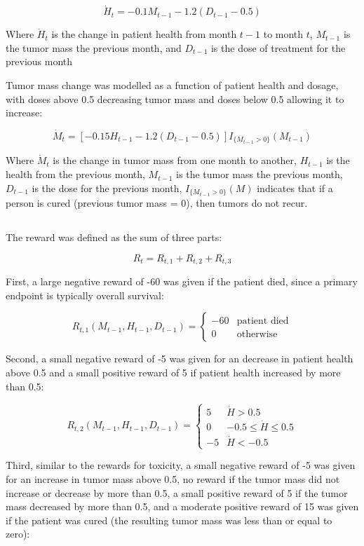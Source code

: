 \documentclass[12pt]{article}
\begin{document}
\[
\dot{H}_{t} = - 0.1 M_{t-1} - 1.2 (D_{t-1} - 0.5)
\]

Where $\dot{H}_{t}$ is the change in patient health from month $t-1$ to month $t$, 
$M_{t-1}$ is the tumor mass the previous month, and 
$D_{t-1}$ is the dose of treatment for the previous month

Tumor mass change was modelled as a function of patient health and dosage, with doses above 0.5 decreasing tumor mass and doses below 0.5 allowing it to increase:

\[
\dot{M}_{t} = [- 0.15 H_{t-1} - 1.2 (D_{t-1} - 0.5)] I_{\{M_{t-1} > 0\}}(M_{t-1})
\]

Where $\dot{M}_{t}$ is the change in tumor mass from one month to another,
$H_{t-1}$ is the health from the previous month,
$M_{t-1}$ is the tumor mass the previous month,
$D_{t-1}$ is the dose for the previous month,
$I_{\{M_{t-1} > 0\}}(M)$ indicates that if a person is cured (previous tumor mass = 0), then tumors do not recur.



\subsection{} %
\label{sub:}

The reward was defined as the sum of three parts: 

\[
R_{t} = R_{t, 1} + R_{t, 2} + R_{t, 3}
\]

First, a large negative reward of -60 was given if the patient died, since a primary endpoint is typically overall survival:

\[
R_{t, 1}(M_{t-1}, H_{t-1}, D_{t-1}) = 
\begin{cases}
  -60 & \text{patient died} \\
  0 & \text{otherwise}
\end{cases}
\]

Second, a small negative reward of -5 was given for an decrease in patient health above 0.5 and a small positive reward of 5 if patient health increased by more than 0.5:

\[
R_{t, 2}(M_{t-1}, H_{t-1}, D_{t-1}) =  
\begin{cases}
  5 & \dot{H} > 0.5 \\
  0 & -0.5 \leq \dot{H} \leq 0.5 \\
  -5 & \dot{H} < -0.5
\end{cases}
\]

Third, similar to the rewards for toxicity, a small negative reward of -5 was given for an increase in tumor mass above 0.5, no reward if the tumor mass did not increase or decrease by more than 0.5, a small positive reward of 5 if the tumor mass decreased by more than 0.5, and a moderate positive reward of 15 was given if the patient was cured (the resulting tumor mass was less than or equal to zero):
\end{document}
